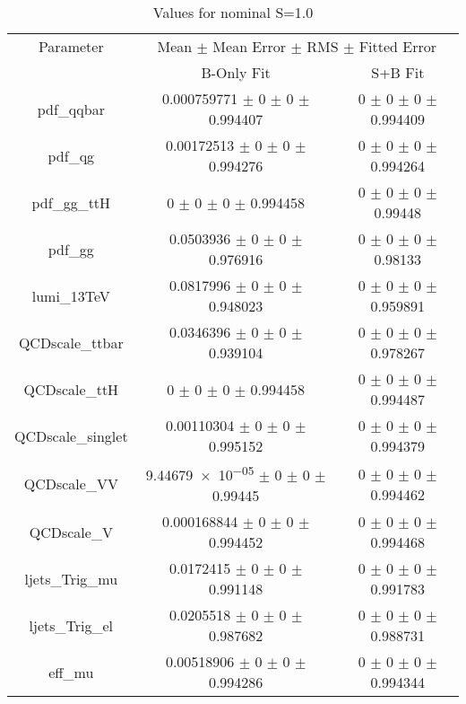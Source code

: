 \begin{table}
\centering
\caption{Values for nominal S=1.0}
\begin{tabular}{ccc}
\toprule
Parameter & \multicolumn{2}{c}{Mean $\pm$ Mean Error $\pm$ RMS $\pm$ Fitted Error}\\
 & B-Only Fit & S+B Fit\\
\midrule
pdf\_qqbar & \num{0.000759771} $\pm$ \num{0} $\pm$ \num{0} $\pm$ \num{0.994407} & \num{0} $\pm$ \num{0} $\pm$ \num{0} $\pm$ \num{0.994409}\\
pdf\_qg & \num{0.00172513} $\pm$ \num{0} $\pm$ \num{0} $\pm$ \num{0.994276} & \num{0} $\pm$ \num{0} $\pm$ \num{0} $\pm$ \num{0.994264}\\
pdf\_gg\_ttH & \num{0} $\pm$ \num{0} $\pm$ \num{0} $\pm$ \num{0.994458} & \num{0} $\pm$ \num{0} $\pm$ \num{0} $\pm$ \num{0.99448}\\
pdf\_gg & \num{0.0503936} $\pm$ \num{0} $\pm$ \num{0} $\pm$ \num{0.976916} & \num{0} $\pm$ \num{0} $\pm$ \num{0} $\pm$ \num{0.98133}\\
lumi\_13TeV & \num{0.0817996} $\pm$ \num{0} $\pm$ \num{0} $\pm$ \num{0.948023} & \num{0} $\pm$ \num{0} $\pm$ \num{0} $\pm$ \num{0.959891}\\
QCDscale\_ttbar & \num{0.0346396} $\pm$ \num{0} $\pm$ \num{0} $\pm$ \num{0.939104} & \num{0} $\pm$ \num{0} $\pm$ \num{0} $\pm$ \num{0.978267}\\
QCDscale\_ttH & \num{0} $\pm$ \num{0} $\pm$ \num{0} $\pm$ \num{0.994458} & \num{0} $\pm$ \num{0} $\pm$ \num{0} $\pm$ \num{0.994487}\\
QCDscale\_singlet & \num{0.00110304} $\pm$ \num{0} $\pm$ \num{0} $\pm$ \num{0.995152} & \num{0} $\pm$ \num{0} $\pm$ \num{0} $\pm$ \num{0.994379}\\
QCDscale\_VV & \num{9.44679e-05} $\pm$ \num{0} $\pm$ \num{0} $\pm$ \num{0.99445} & \num{0} $\pm$ \num{0} $\pm$ \num{0} $\pm$ \num{0.994462}\\
QCDscale\_V & \num{0.000168844} $\pm$ \num{0} $\pm$ \num{0} $\pm$ \num{0.994452} & \num{0} $\pm$ \num{0} $\pm$ \num{0} $\pm$ \num{0.994468}\\
ljets\_Trig\_mu & \num{0.0172415} $\pm$ \num{0} $\pm$ \num{0} $\pm$ \num{0.991148} & \num{0} $\pm$ \num{0} $\pm$ \num{0} $\pm$ \num{0.991783}\\
ljets\_Trig\_el & \num{0.0205518} $\pm$ \num{0} $\pm$ \num{0} $\pm$ \num{0.987682} & \num{0} $\pm$ \num{0} $\pm$ \num{0} $\pm$ \num{0.988731}\\
eff\_mu & \num{0.00518906} $\pm$ \num{0} $\pm$ \num{0} $\pm$ \num{0.994286} & \num{0} $\pm$ \num{0} $\pm$ \num{0} $\pm$ \num{0.994344}\\

\end{tabular}
\end{table}
